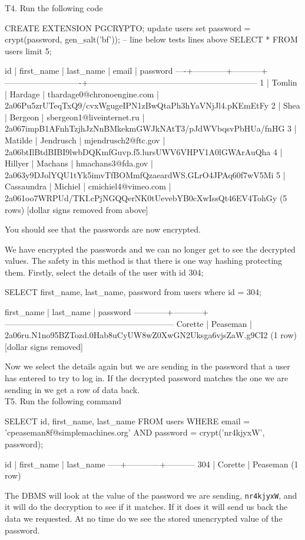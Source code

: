 T4. Run the following code
\begin{sql}
CREATE EXTENSION PGCRYPTO; 
update users set password = crypt(password, gen_salt('bf'));
-- line below tests lines above
SELECT * FROM users limit 5;
\end{sql}
\begin{pseudo}
 id | first_name | last_name |           email            |                           password
----+------------+-----------+----------------------------+--------------------------------------------------------------
  1 | Tomlin     | Hardage   | thardage0@chronoengine.com | 2a06Pu5zrUTeqTxQ9/cvxWgugeIPN1zBwQtaPh3hYaVNjJl4.pKEmEtFy
  2 | Shea       | Bergeon   | sbergeon1@liveinternet.ru  | 2a067impB1AFnhTzjhJzNnBMkekmGWJkNAtT3/pJdWVbqsvPbHUa/fnHG
  3 | Matilde    | Jendrusch | mjendrusch2@ftc.gov        | 2a06btIlBtdBIBI9lwbDQKmfGuvp.f5.lursUWV6VHPV1A0lGWArAuQha
  4 | Hillyer    | Machans   | hmachans3@fda.gov          | 2a063y9DJolYQU1tYk5imvTfBOMmfQzaeardWS.GLrO4JPAq60f7wV5Mi
  5 | Cassaundra | Michiel   | cmichiel4@vimeo.com        | 2a061oo7WRPUd/TKI.cPjNGQQerNK0tUevebYB0cXwIssQt46EV4TohGy
(5 rows)
[dollar signs removed from above]
\end{pseudo}

You should see that the passwords are now encrypted.

We have encrypted the passwords and we can no longer get to see the decrypted values. The safety in this method is that there is one way hashing protecting them. Firstly, select the details of the user with id 304;
\begin{sql}
SELECT first_name, last_name, password from users where id = 304;
\end{sql}
\begin{pseudo}
 first_name | last_name |                           password
------------+-----------+--------------------------------------------------------------
 Corette    | Peaseman  | 2a06ru.N1no95BZTozd.0Hab8uCyUW8wZ0XwGN2Uksga6vjsZaW.g9CI2
(1 row)
[dollar signs removed]
\end{pseudo}

Now we select the details again but we are sending in the password that a user has entered to try to log in. If the decrypted password matches the one we are sending in we get a row of data back.\\

T5. Run the following command
\begin{sql}
SELECT id,
   	first_name,
   	last_name
FROM users
WHERE email = 'cpeaseman8f@simplemachines.org'
  AND password = crypt('nr4kjyxW', password);
\end{sql}
\begin{pseudo}
 id  | first_name | last_name
-----+------------+-----------
 304 | Corette    | Peaseman
(1 row)
\end{pseudo}
The DBMS will look at the value of the password we are sending, \verb|nr4kjyxW|, and it will do the decryption to see if it matches. If it does it will send us back the data we requested. At no time do we see the stored unencrypted value of the password.\\

